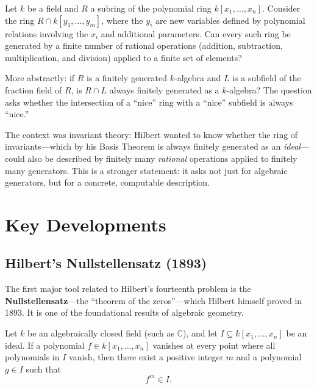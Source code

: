 \begin{problem_statement}
Let $k$ be a field and $R$ a subring of the polynomial ring $k[x_1, \ldots, x_n]$. Consider the ring $R \cap k[y_1, \ldots, y_m]$, where the $y_i$ are new variables defined by polynomial relations involving the $x_i$ and additional parameters. Can every such ring be generated by a finite number of rational operations (addition, subtraction, multiplication, and division) applied to a finite set of elements?
\end{problem_statement}

More abstractly: if $R$ is a finitely generated $k$-algebra and $L$ is a subfield of the fraction field of $R$, is $R \cap L$ always finitely generated as a $k$-algebra? The question asks whether the intersection of a ``nice'' ring with a ``nice'' subfield is always ``nice.''

The context was invariant theory: Hilbert wanted to know whether the ring of invariants---which by his Basis Theorem is always finitely generated as an \emph{ideal}---could also be described by finitely many \emph{rational} operations applied to finitely many generators. This is a stronger statement: it asks not just for algebraic generators, but for a concrete, computable description.

\section{Key Developments}

\subsection{Hilbert's Nullstellensatz (1893)}

The first major tool related to Hilbert's fourteenth problem is the \textbf{Nullstellensatz}---the ``theorem of the zeros''---which Hilbert himself proved in 1893. It is one of the foundational results of algebraic geometry.

\begin{theorem}\label{thm:nullstellensatz}
Let $k$ be an algebraically closed field (such as $\mathbb{C}$), and let $I \subseteq k[x_1, \ldots, x_n]$ be an ideal. If a polynomial $f \in k[x_1, \ldots, x_n]$ vanishes at every point where all polynomials in $I$ vanish, then there exist a positive integer $m$ and a polynomial $g \in I$ such that
\[
    f^m \in I.
\]
\end{theorem}

